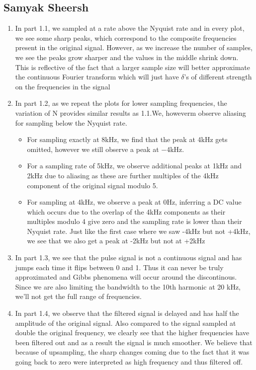 \documentclass{article}
\begin{document}
\subsection{Samyak Sheersh}
\begin{enumerate}
  \item In part 1.1, we sampled at a rate above the Nyquist rate and in every plot, we see some sharp peaks, which correspond to the composite frequencies present in the original signal. However, as we increase the number of samples, we see the peaks grow sharper and the values in the middle shrink down. This is reflective of the fact that a larger sample size will better approximate the continuous Fourier transform which will just have $\delta$'s of different strength on the frequencies in the signal

  \item In part 1.2, as we repeat the plots for lower sampling frequencies, the variation of N provides similar results as 1.1.We, howeverm observe aliasing for sampling below the Nyquist rate. 
    \begin{itemize}
      \item For sampling exactly at 8kHz, we find that the peak at 4kHz gets omitted, however we still observe a peak at $-$4kHz.

      \item For a sampling rate of 5kHz, we observe additional peaks at 1kHz and 2kHz due to aliasing as these are further multiples of the 4kHz component of the original signal modulo 5. 

      \item For sampling at 4kHz, we observe a peak at 0Hz, inferring a DC value which occurs due to the overlap of the 4kHz components as their multiples modulo 4 give zero and the sampling rate is lower than their Nyquist rate. Just like the first case where we saw -4kHz but not +4kHz, we see that we also get a peak at -2kHz but not at +2kHz
  \end{itemize}

  \item In part 1.3, we see that the pulse signal is not a continuous signal and has jumps each time it flips between 0 and 1. Thus it can never be truly approximated and Gibbs phenomena will occur around the discontinous. Since we are also limiting the bandwidth to the 10th harmonic at 20 kHz, we'll not get the full range of frequencies. 

  \item In part 1.4, we observe that the filtered signal is delayed and has half the amplitude of the original signal. Also compared to the signal sampled at double the original frequency, we clearly see that the higher frequencies have been filtered out and as a result the signal is much smoother. We believe that because of upsampling, the sharp changes coming due to the fact that it was going back to zero were interpreted as high frequency and thus filtered off.  
\end{enumerate}
\end{document}
